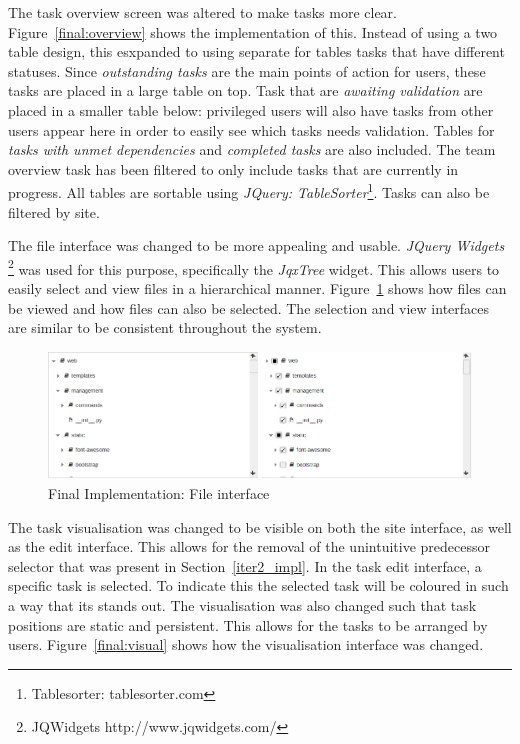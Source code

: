 The task overview screen was altered to make tasks more clear. Figure~\ref{final:overview}
shows the implementation of this. Instead of using a two table design, this  esxpanded to
using separate for tables tasks that have different statuses. Since \emph{outstanding tasks}
are the main points of action for users, these tasks are placed in a large table on top.
Task that are \emph{awaiting validation} are placed in a smaller table below: privileged
users will also have tasks from other users appear here in order to easily see which tasks
needs validation. Tables for \emph{tasks with unmet dependencies} and
\emph{completed tasks} are also included. The team overview task has been filtered
to only include tasks that are currently in progress. All tables are sortable
using \emph{JQuery: TableSorter}\footnote{Tablesorter: tablesorter.com}. Tasks can
also be filtered by site.

The file interface was changed to be more appealing and usable. \emph{JQuery Widgets}
\footnote{JQWidgets http://www.jqwidgets.com/} was used for this purpose, specifically
the \emph{JqxTree} widget. This allows users to easily select and view files in a hierarchical
manner. Figure~\ref{final:tree_view} shows how files can be viewed and how files can also be
selected. The selection and view interfaces are similar to be consistent throughout the system.

\begin{figure}[!h]
    \begin{center}
        \includegraphics[scale=0.45]{figures/final-interface.png}
    \end{center}
    \caption{Final Implementation: File interface}
    \label{final:tree_view}
\end{figure}

The task visualisation was changed to be visible on both the site interface, as well as the
edit interface. This allows for the removal of the unintuitive predecessor selector that
was present in Section~\ref{iter2_impl}. In the task edit interface, a
specific task is selected. To indicate this the selected task will be
coloured in such a way that its stands out. The visualisation was also
changed such that task positions are static and persistent. This allows
for the tasks to be arranged by users. Figure~\ref{final:visual} shows
how the visualisation interface was changed.


